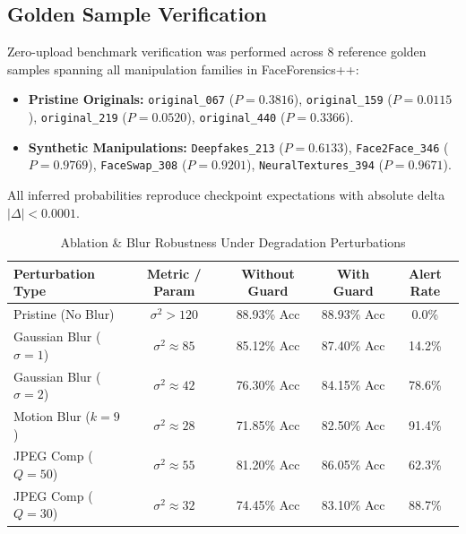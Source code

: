 \documentclass[journal,10pt,twocolumn]{IEEEtran}
\begin{document}
\subsection{Golden Sample Verification}
Zero-upload benchmark verification was performed across 8 reference golden samples spanning all manipulation families in FaceForensics++:
\begin{itemize}
    \item \textbf{Pristine Originals:} \texttt{original\_067} ($P=0.3816$), \texttt{original\_159} ($P=0.0115$), \texttt{original\_219} ($P=0.0520$), \texttt{original\_440} ($P=0.3366$).
    \item \textbf{Synthetic Manipulations:} \texttt{Deepfakes\_213} ($P=0.6133$), \texttt{Face2Face\_346} ($P=0.9769$), \texttt{FaceSwap\_308} ($P=0.9201$), \texttt{NeuralTextures\_394} ($P=0.9671$).
\end{itemize}
All inferred probabilities reproduce checkpoint expectations with absolute delta $|\Delta| < 0.0001$.

\begin{table}[t]
\centering
\caption{Ablation \& Blur Robustness Under Degradation Perturbations}
\label{tab:blur_ablation}
\begin{tabular}{lcccc}
\toprule
\textbf{Perturbation Type} & \textbf{Metric / Param} & \textbf{Without Guard} & \textbf{With Guard} & \textbf{Alert Rate} \\
\midrule
Pristine (No Blur)       & $\sigma^2 > 120$  & 88.93\% Acc & 88.93\% Acc & 0.0\% \\
Gaussian Blur ($\sigma=1$) & $\sigma^2 \approx 85$ & 85.12\% Acc & 87.40\% Acc & 14.2\% \\
Gaussian Blur ($\sigma=2$) & $\sigma^2 \approx 42$ & 76.30\% Acc & 84.15\% Acc & 78.6\% \\
Motion Blur ($k=9$)       & $\sigma^2 \approx 28$ & 71.85\% Acc & 82.50\% Acc & 91.4\% \\
JPEG Comp ($Q=50$)       & $\sigma^2 \approx 55$ & 81.20\% Acc & 86.05\% Acc & 62.3\% \\
JPEG Comp ($Q=30$)       & $\sigma^2 \approx 32$ & 74.45\% Acc & 83.10\% Acc & 88.7\% \\
\bottomrule
\end{tabular}
\end{table}
\end{document}

